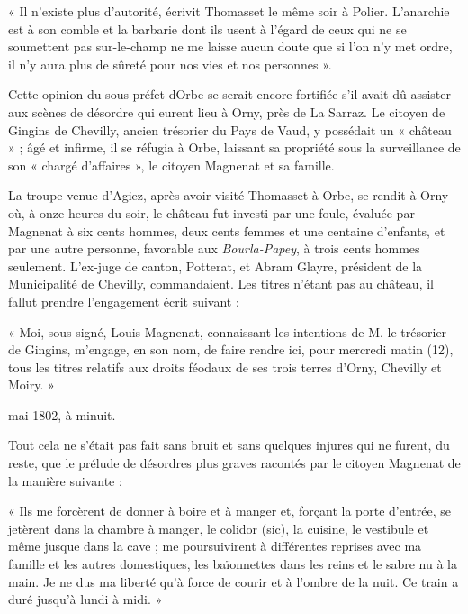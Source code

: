 \documentclass[french,twoside]{book} %
\newenvironment{quoteblock}%
  {\begin{quoting}}
  {\end{quoting}}
\newenvironment{quotebar}{%
    \def\FrameCommand{{\color{rubric!10!}\vrule width 0.5em} \hspace{0.9em}}%
    \def\OuterFrameSep{\itemsep} %
    \MakeFramed {\advance\hsize-\width \FrameRestore}
  }%
  {%
    \endMakeFramed
  }
\renewenvironment{quoteblock}%
  {%
    \savenotes
    \setstretch{0.9}
    \begin{quotebar}
  }
  {%
    \end{quotebar}
    \spewnotes
  }
\begin{document}
\begin{quoteblock}
 \noindent « Il n’existe plus d’autorité, écrivit Thomasset le même soir à Polier. L’anarchie est à son comble et la barbarie dont ils usent à l’égard de ceux qui ne se soumettent pas sur-le-champ ne me laisse aucun doute que si l’on n’y met ordre, il n’y aura plus de sûreté pour nos vies et nos personnes ».
 \end{quoteblock}

\noindent Cette opinion du sous-préfet dOrbe se serait encore fortifiée s’il avait dû assister aux scènes de désordre qui eurent lieu à Orny, près de La Sarraz. Le citoyen de Gingins de Chevilly, ancien trésorier du Pays de Vaud, y possédait un « château » ; âgé et infirme, il se réfugia à Orbe, laissant sa propriété sous la surveillance de son « chargé d’affaires », le citoyen Magnenat et sa famille.\par
La troupe venue d’Agiez, après avoir visité Thomasset à Orbe, se rendit à Orny où, à onze heures du soir, le château fut investi par une foule, évaluée par Magnenat à six cents hommes, deux cents femmes et une centaine d’enfants, et par une autre personne, favorable aux \emph{Bourla-Papey}, à trois cents hommes seulement. L’ex-juge de canton, Potterat, et Abram Glayre, président de la Municipalité de Chevilly, commandaient. Les titres n’étant pas au château, il fallut prendre l’engagement écrit suivant :\par

\begin{quoteblock}
 \noindent « Moi, sous-signé, Louis Magnenat, connaissant les intentions de M. le trésorier de Gingins, m’engage, en son nom, de faire rendre ici, pour mercredi matin (12), tous les titres relatifs aux droits féodaux de ses trois terres d’Orny, Chevilly et Moiry. »
 \end{quoteblock}

 mai 1802, à minuit.\par
Tout cela ne s’était pas fait sans bruit et sans quelques injures qui ne furent, du reste, que le prélude de désordres plus graves racontés par le citoyen Magnenat de la manière suivante :\par

\begin{quoteblock}
 \noindent « Ils me forcèrent de donner à boire et à manger et, forçant la porte d’entrée, se jetèrent dans la chambre à manger, le colidor (sic), la cuisine, le vestibule et même jusque dans la cave ; me poursuivirent à différentes reprises avec ma famille et les autres domestiques, les baïonnettes dans les reins et le sabre nu à la main. Je ne dus ma liberté qu’à force de courir et à l’ombre de la nuit. Ce train a duré jusqu’à lundi à midi. »
 \end{quoteblock}
\end{document}
